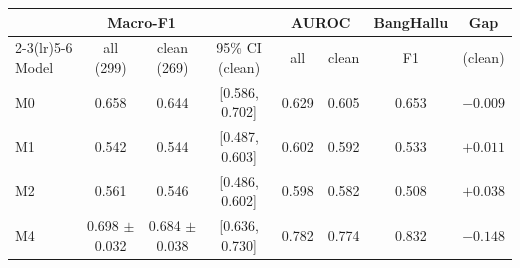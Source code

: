 \begin{tabular}{@{}lccccccc@{}}
\toprule
 & \multicolumn{2}{c}{Macro-F1} & & \multicolumn{2}{c}{AUROC} & BangHallu & Gap \\
\cmidrule(lr){2-3}\cmidrule(lr){5-6}
Model & all (299) & clean (269) & 95\% CI (clean) & all & clean & F1 & (clean) \\
\midrule
M0 & 0.658 & 0.644 & [0.586, 0.702] & 0.629 & 0.605 & 0.653 & $-0.009$ \\
M1 & 0.542 & 0.544 & [0.487, 0.603] & 0.602 & 0.592 & 0.533 & $+0.011$ \\
M2 & 0.561 & 0.546 & [0.486, 0.602] & 0.598 & 0.582 & 0.508 & $+0.038$ \\
M4 & 0.698 $\pm$ 0.032 & 0.684 $\pm$ 0.038 & [0.636, 0.730] & 0.782 & 0.774 & 0.832 & $-0.148$ \\
\bottomrule
\end{tabular}
